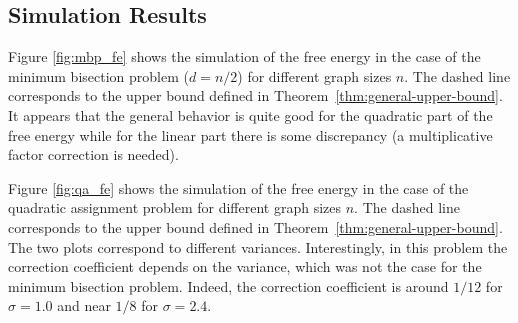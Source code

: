 \subsection{Simulation Results}
\label{sec:free_simulations_free}

Figure \ref{fig:mbp_fe} shows the simulation of the free energy in the case
of the minimum bisection problem ($d=n/2$) for different graph sizes $n$. The dashed line
corresponds to the upper bound defined in Theorem~\ref{thm:general-upper-bound}.
It appears that the general behavior is quite good for the quadratic part of the
free energy while for the linear part there is some discrepancy (a
multiplicative factor correction is needed).

Figure \ref{fig:qa_fe} shows the simulation of the free energy in the case of
the quadratic assignment problem for different graph sizes $n$. The dashed line
corresponds to the upper bound defined in Theorem~\ref{thm:general-upper-bound}.
The two plots correspond to different variances. Interestingly, in this problem
the correction coefficient depends on the variance, which was not the case for
the minimum bisection problem. Indeed, the correction coefficient is around
$1/12$ for $\sigma=1.0$ and near $1/8$ for $\sigma=2.4$.

